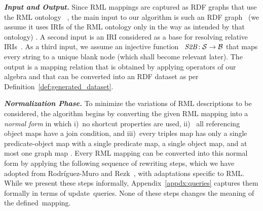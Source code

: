 \smallskip\noindent\textbf{\itshape Input and Output.}
Since RML mappings are captured as RDF graphs that use
	the RML ontology~\cite{IglesiasMolina2023:RMLOntology}%
, the main input to our algorithm is such an RDF graph%
	~(we assume it uses IRIs of the RML ontology only in the way as intended by that ontology)%
. A second input is an IRI considered as a base for resolving relative IRIs~\cite{Dimou2024:RMLSpec}. As a third input, we assume an injective function~%
	$\mathit{S2B} \!: \mathcal{S} \rightarrow \mathcal{B}$
that maps every string to a unique blank node (which shall become relevant later). The output
is a mapping relation that is obtained by
	applying
operators of our algebra and that can be converted into an RDF dataset as per Definition~\ref{def:generated_dataset}.


\smallskip\noindent\textbf{\itshape Normalization Phase.}
To minimize the
	variations of RML descriptions
%
	to be considered, the algorithm
begins by converting the given RML mapping into a \emph{normal form} in which i)~no shortcut properties
are used, ii)~%
	all referencing object maps have
a join condition, and iii)~every triples map has only a single predicate-object map with a single predicate map, a single object map, and at most one graph map%
.
\enlargethispage{\baselineskip}%
Every RML mapping can be converted into this normal form by applying the following sequence of rewriting steps, which we have adopted from Rodríguez-Muro and Rezk~\cite{Mariano2015SPARQL2SQL}, with adaptations specific to RML.
While we present these steps informally,
Appendix~\ref{appdx:queries} captures them formally in terms of update~queries.
None of these steps changes the meaning of the defined~mapping.

